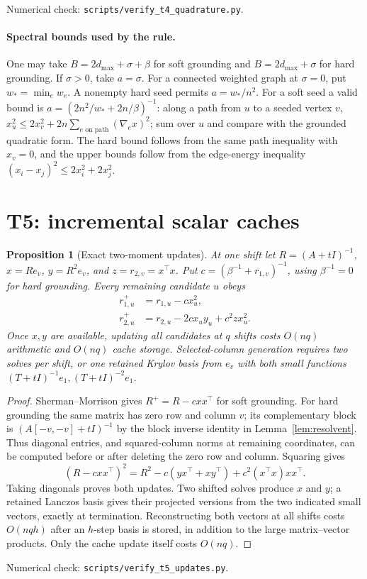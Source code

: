 \documentclass[11pt]{article}
\newtheorem{proposition}[theorem]{Proposition}
\begin{document}
\noindent Numerical check: \texttt{scripts/verify\_t4\_quadrature.py}.

\paragraph{Spectral bounds used by the rule.}
One may take $B=2d_{\max}+\sigma+\beta$ for soft grounding and
$B=2d_{\max}+\sigma$ for hard grounding. If $\sigma>0$, take
$a=\sigma$. For a connected weighted graph at $\sigma=0$, put
$w_*=\min_e w_e$. A nonempty hard seed permits $a=w_*/n^2$.
For a soft seed a valid bound is
$a=(2n^2/w_*+2n/\beta)^{-1}$: along a path from $u$ to a seeded
vertex $v$, $x_u^2\leq2x_v^2+2n\sum_{e\text{ on path}}(\nabla_ex)^2$;
sum over $u$ and compare with the grounded quadratic form.
The hard bound follows from the same path inequality with $x_v=0$,
and the upper bounds follow from the edge-energy inequality
$(x_i-x_j)^2\leq2x_i^2+2x_j^2$.

\section{T5: incremental scalar caches}
\begin{proposition}[Exact two-moment updates]\label{prop:updates}
At one shift let $R=(A+tI)^{-1}$, $x=Re_v$, $y=R^2e_v$, and
$z=r_{2,v}=x^\top x$. Put $c=(\beta^{-1}+r_{1,v})^{-1}$, using
$\beta^{-1}=0$ for hard grounding. Every remaining candidate $u$ obeys
\begin{align}
 r_{1,u}^+&=r_{1,u}-c x_u^2,\label{eq:updateone}\\
 r_{2,u}^+&=r_{2,u}-2c x_u y_u+c^2 z x_u^2.\label{eq:updatetwo}
\end{align}
Once $x,y$ are available, updating all candidates at $q$ shifts costs
$O(nq)$ arithmetic and $O(nq)$ cache storage. Selected-column generation
requires two solves per shift, or one retained Krylov basis from $e_v$
with both small functions $(T+tI)^{-1}e_1,(T+tI)^{-2}e_1$.
\end{proposition}
\begin{proof}
Sherman--Morrison gives $R^+=R-cxx^\top$ for soft grounding.
For hard grounding the same matrix has zero row and column $v$;
its complementary block is $(A[-v,-v]+tI)^{-1}$ by the block inverse
identity in Lemma~\ref{lem:resolvent}. Thus diagonal entries, and
squared-column norms at remaining coordinates, can be computed before
or after deleting the zero row and column. Squaring gives
\[
 (R-cxx^\top)^2=R^2-c(yx^\top+xy^\top)+c^2(x^\top x)xx^\top.
\]
Taking diagonals proves both updates. Two shifted solves produce
$x$ and $y$; a retained Lanczos basis gives their projected versions
from the two indicated small vectors, exactly at termination.
Reconstructing both vectors at all shifts costs $O(nqh)$ after an
$h$-step basis is stored, in addition to the large matrix--vector
products. Only the cache update itself costs $O(nq)$.
\end{proof}
\noindent Numerical check: \texttt{scripts/verify\_t5\_updates.py}.
\end{document}
